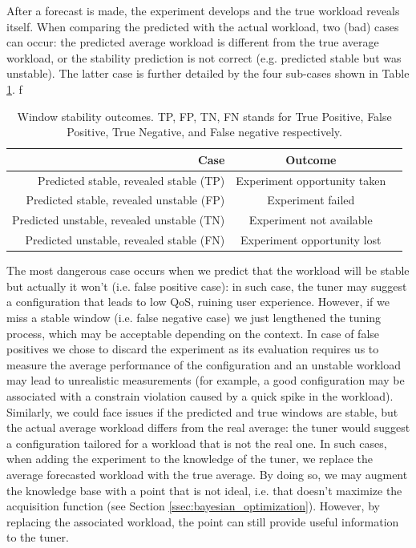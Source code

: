 \documentclass[a4paper, 12pt]{article} %
\newcommand{\ra}[1]{\renewcommand{\arraystretch}{#1}}
\begin{document}
	 After a forecast is made, the experiment develops and the true workload reveals itself. When comparing the predicted with the actual workload, two (bad) cases can occur: the predicted average workload is different from the true average workload, or the stability prediction is not correct (e.g. predicted stable but was unstable). The latter case is further detailed by the four sub-cases shown in Table \ref{table:stability_cases}. 	 
	 f\begin{table}\centering 
	 	\ra{1.3}
	 	\begin{tabular*}{\textwidth}{@{}rcr@{}}
	 		\toprule
	 		Case & Outcome\\
	 		\midrule
	 		Predicted stable, revealed stable (TP) & Experiment opportunity taken\\
	 		Predicted stable, revealed unstable (FP)& Experiment failed\\
	 		Predicted unstable, revealed unstable (TN)& Experiment not available\\
	 		Predicted unstable, revealed stable (FN)& Experiment opportunity lost\\
	 		\bottomrule
	 	\end{tabular*}
	 	\caption{Window stability outcomes. TP, FP, TN, FN stands for True Positive, False Positive, True Negative, and False negative respectively.} \label{table:stability_cases}
	 \end{table}
	 The most dangerous case occurs when we predict that the workload will be stable but actually it won't (i.e. false positive case): in such case, the tuner may suggest a configuration that leads to low QoS, ruining user experience. However, if we miss a stable window (i.e. false negative case) we just lengthened the tuning process, which may be acceptable depending on the context.
	 In case of false positives we chose to discard the experiment as its evaluation requires us to measure the average performance of the configuration and an unstable workload may lead to unrealistic measurements (for example, a good configuration may be associated with a constrain violation caused by a quick spike in the workload).\\
	 Similarly, we could face issues if the predicted and true windows are stable, but the actual average workload differs from the real average: the tuner would suggest a configuration tailored for a workload that is not the real one. In such cases, when adding the experiment to the knowledge of the tuner, we replace the average forecasted workload with the true average. By doing so, we may augment the knowledge base with a point that is not ideal, i.e. that doesn't maximize the acquisition function (see Section \ref{ssec:bayesian_optimization}). However, by replacing the associated workload, the point can still provide useful information to the tuner.
	 
\end{document}
